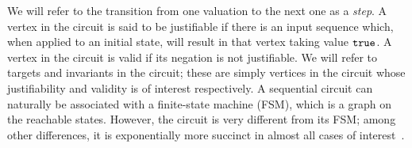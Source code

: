 

%

%

%
We will refer to the transition from one valuation
to the next one as a {\em step}.  A vertex in the circuit is
said to be justifiable if there is an input sequence which, when
applied to an initial state, will result in that vertex
taking value $\mathtt{true}$.  A vertex in the circuit is
valid if its negation is not justifiable.  We will refer
to targets and invariants in the circuit; these are simply
vertices in the circuit whose justifiability and validity
is of interest respectively.
A sequential circuit can naturally
be associated with a finite-state machine (FSM),
which is a graph on the reachable states.  However, the 
circuit is very different from its FSM; among
other differences, it is exponentially more succinct in
almost all cases of interest~\cite{BuClMcDiHw92}. 
%
%
